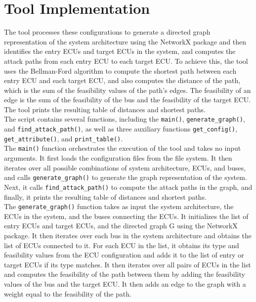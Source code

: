 \section{Tool Implementation}
\label{sec:implementation}

The tool processes these configurations to generate a directed graph representation of the system architecture using the NetworkX package and
then identifies the entry ECUs and target ECUs in the system, and computes the attack paths from each entry ECU to each target ECU. 
To achieve this, the tool uses the Bellman-Ford algorithm to compute the shortest path between each entry ECU and each target ECU, 
and also computes the distance of the path, which is the sum of the feasibility values of the path's edges. 
The feasibility of an edge is the sum of the feasibility of the bus and the feasibility of the target ECU. 
The tool prints the resulting table of distances and shortest paths.\\

The script contains several functions, including the \texttt{main()}, \texttt{generate\_graph()}, and \texttt{find\_attack\_path()}, 
as well as three auxiliary functions \texttt{get\_config()}, \texttt{get\_attribute()}, and \texttt{print\_table()}. \\

The \texttt{main()} function orchestrates the execution of the tool and takes no input arguments. 
It first loads the configuration files from the file system. 
It then iterates over all possible combinations of system architecture, ECUs, and buses, and calls \texttt{generate\_graph()} to generate the graph representation of the system. 
Next, it calls \texttt{find\_attack\_path()} to compute the attack paths in the graph, and finally, it prints the resulting table of distances and shortest paths.\\

The \texttt{generate\_graph()} function takes as input the system architecture, 
the ECUs in the system, and the buses connecting the ECUs. It initializes the list of entry ECUs and target ECUs, and the directed graph G using the NetworkX package. 
It then iterates over each bus in the system architecture and obtains the list of ECUs connected to it. 
For each ECU in the list, it obtains its type and feasibility values from the ECU configuration and adds it to the list of entry or target ECUs if its type matches. 
It then iterates over all pairs of ECUs in the list and computes the feasibility of the path between them by adding the feasibility values of the bus and the target ECU. 
It then adds an edge to the graph with a weight equal to the feasibility of the path.\\

